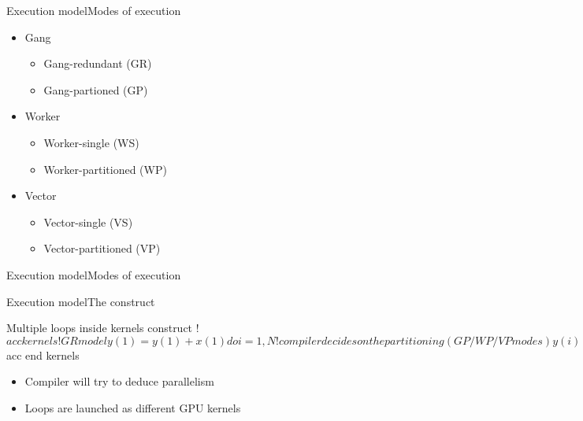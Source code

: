 \documentclass[12pt,aspectratio=169]{beamer}
\begin{document}
\begin{frame}{Execution model}{Modes of execution}
  \begin{itemize}
  \item Gang
    \begin{itemize}
    \item Gang-redundant (GR)
    \item Gang-partioned (GP)
    \end{itemize}
  \item Worker
    \begin{itemize}
    \item Worker-single (WS)
    \item Worker-partitioned (WP)
    \end{itemize}
  \item Vector
    \begin{itemize}
    \item Vector-single (VS)
    \item Vector-partitioned (VP)
    \end{itemize}
  \end{itemize}
\end{frame}

\begin{frame}{Execution model}{Modes of execution}
  \begin{figure}
    \centering
  \end{figure}
\end{frame}


\begin{frame}[fragile]{Execution model}{The  construct}
  \begin{Fortranlisting}{Multiple loops inside kernels construct}
!$acc kernels
    !GR model
    y(1) = y(1) + x(1)
    do i = 1, N
        !compiler decides on the partitioning (GP/WP/VP modes)
        y(i) = y(i) + a*x(i)
    enddo
    do i = 1, N
        !compiler decides on the partitioning (GP/WP/VP modes)
        y(i) = b*y(i) + a*x(i)
    enddo
!$acc end kernels
  \end{Fortranlisting}
  \begin{itemize}
  \item Compiler will try to deduce parallelism
  \item Loops are launched as different GPU kernels
  \end{itemize}
\end{frame}
\end{document}
